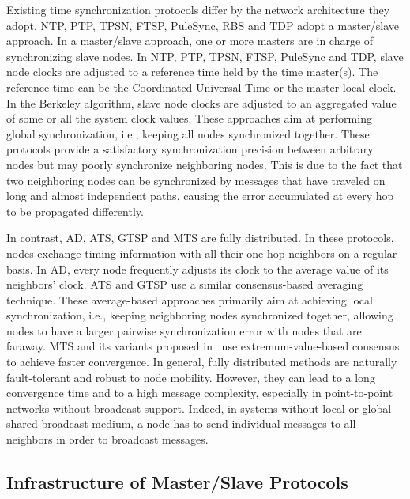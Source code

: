 Existing time synchronization protocols differ by the network architecture they adopt. NTP, PTP, TPSN, FTSP, PuleSync, RBS and TDP adopt a master/slave approach. In a master/slave approach, one or more masters are in charge of synchronizing slave nodes. In NTP, PTP, TPSN, FTSP, PuleSync and TDP, slave node clocks are adjusted to a reference time held by the time master(s). The reference time can be the Coordinated Universal Time or the master local clock. In the Berkeley algorithm, slave node clocks are adjusted to an aggregated value of some or all the system clock values. These approaches aim at performing global synchronization, i.e., keeping all nodes synchronized together. These protocols provide a satisfactory synchronization precision between arbitrary nodes but may poorly synchronize neighboring nodes. This is due to the fact that two neighboring nodes can be synchronized by messages that have traveled on long and almost independent paths, causing the error accumulated at every hop to be propagated differently.

In contrast, AD, ATS, GTSP and MTS are fully distributed. In these protocols, nodes exchange timing information with all their one-hop neighbors on a regular basis. In AD, every node frequently adjusts its clock to the average value of its neighbors' clock. ATS and GTSP use a similar consensus-based averaging technique. These average-based approaches primarily aim at achieving local synchronization, i.e., keeping neighboring nodes synchronized together, allowing nodes to have a larger pairwise synchronization error with nodes that are faraway. MTS and its variants proposed in~\cite{he2014time,he2014study} use extremum-value-based consensus to achieve faster convergence. In general, fully distributed methods are naturally fault-tolerant and robust to node mobility. However, they can lead to a long convergence time and to a high message complexity, especially in point-to-point networks without broadcast support. Indeed, in systems without local or global shared broadcast medium, a node has to send individual messages to all neighbors in order to broadcast messages.

\subsection{Infrastructure of Master/Slave Protocols}
\label{section:synchronization:related-work:infrastructure}

\newcommand{\InfrastructureLess}{infrastructure\hyp less}

